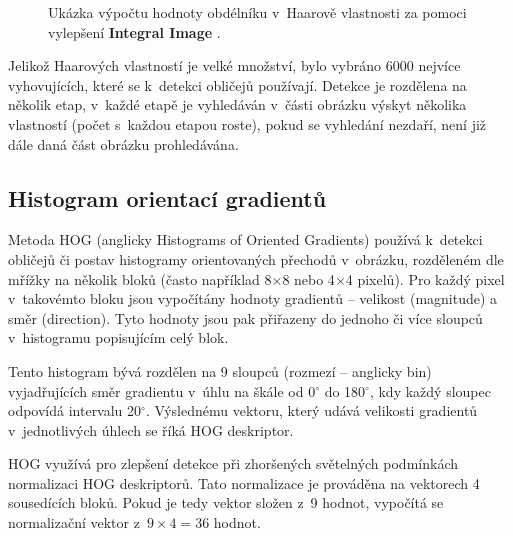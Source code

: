 \begin{figure}[H]
  \begin{center}
  \label{integralimage}
  \caption{Ukázka výpočtu hodnoty obdélníku v~Haarově vlastnosti za pomoci vylepšení \textbf{Integral Image} \cite{violaJonesArticle}.}
  \end{center}
\end{figure}

Jelikož Haarových vlastností je velké množství, bylo vybráno 6000 nejvíce vyhovujících, které se k~detekci obličejů používají. Detekce je rozdělena na několik etap, v~každé etapě je vyhledáván v~části obrázku výskyt několika vlastností (počet s~každou etapou roste), pokud se vyhledání nezdaří, není již dále daná část obrázku prohledávána. 


\subsection*{Histogram orientací gradientů}
Metoda HOG (anglicky Histograms of Oriented Gradients) \cite{hog, hog2} používá k~detekci obličejů či postav histogramy orientovaných přechodů v~obrázku, rozděleném dle mřížky na několik bloků (často například 8$\times$8 nebo 4$\times$4 pixelů). Pro každý pixel v~takovémto bloku jsou vypočítány hodnoty gradientů -- velikost (magnitude) a směr (direction). Tyto hodnoty jsou pak přiřazeny do jednoho či více sloupců v~histogramu popisujícím celý blok.

Tento histogram bývá rozdělen na 9 sloupců (rozmezí -- anglicky bin) vyjadřujících směr gradientu v~úhlu na škále od 0$^\circ$ do 180$^\circ$, kdy každý sloupec odpovídá intervalu 20$^\circ$. Výslednému vektoru, který udává velikosti gradientů v~jednotlivých úhlech se říká HOG deskriptor.

HOG využívá pro zlepšení detekce při zhoršených světelných podmínkách normalizaci HOG deskriptorů. Tato normalizace je prováděna na vektorech 4 sousedících bloků. Pokud je tedy vektor složen z~9 hodnot, vypočítá se normalizační vektor z~$9 \times 4 = 36$ hodnot.

